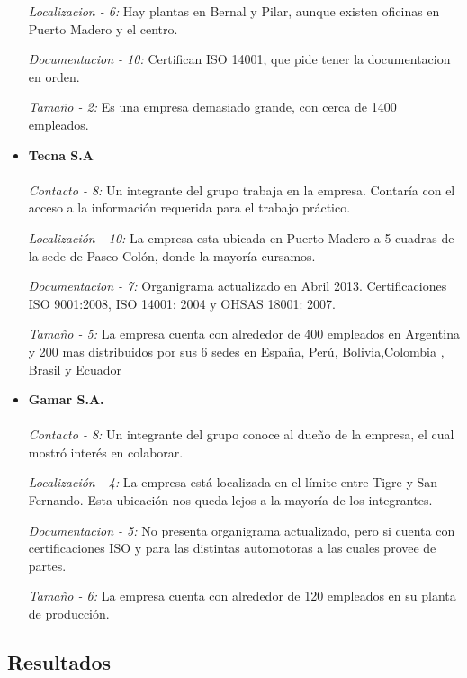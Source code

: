 \documentclass[a4paper,10pt]{article}
\begin{document}
\begin{itemize}
\textit{Localizacion - 6:}
Hay plantas en Bernal y Pilar, aunque existen oficinas en Puerto Madero y el centro.

\textit{Documentacion - 10:}
Certifican ISO 14001, que pide tener la documentacion en orden.

\textit{Tamaño - 2:}
Es una empresa demasiado grande, con cerca de 1400 empleados.


\item \textbf{Tecna S.A} \\
\\
\textit{Contacto - 8:}
Un integrante del grupo trabaja en la empresa. Contaría con el acceso a la información requerida para el trabajo práctico.

\textit{Localización - 10:}
La empresa esta ubicada en Puerto Madero a 5 cuadras de la sede de Paseo Colón, donde la mayoría cursamos.

\textit{Documentacion - 7:}
Organigrama actualizado en Abril 2013. Certificaciones ISO 9001:2008, ISO 14001: 2004 y OHSAS 18001: 2007.

\textit{Tamaño - 5:}
La empresa cuenta con alrededor de 400 empleados en Argentina y 200 mas distribuidos por sus 6 sedes en España, Perú, Bolivia,Colombia , Brasil y Ecuador

\item \textbf{Gamar S.A.} \\
\\
\textit{Contacto - 8:}
Un integrante del grupo conoce al dueño de la empresa, el cual mostró interés en colaborar.

\textit{Localización - 4:}
La empresa está localizada en el límite entre Tigre y San Fernando. Esta ubicación nos queda lejos a la mayoría de los integrantes.

\textit{Documentacion - 5:}
No presenta organigrama actualizado, pero si cuenta con certificaciones ISO y para las distintas automotoras a las cuales provee de partes.

\textit{Tamaño - 6:}
La empresa cuenta con alrededor de 120 empleados en su planta de producción.


\end{itemize}


\subsection{Resultados}
\end{document}
